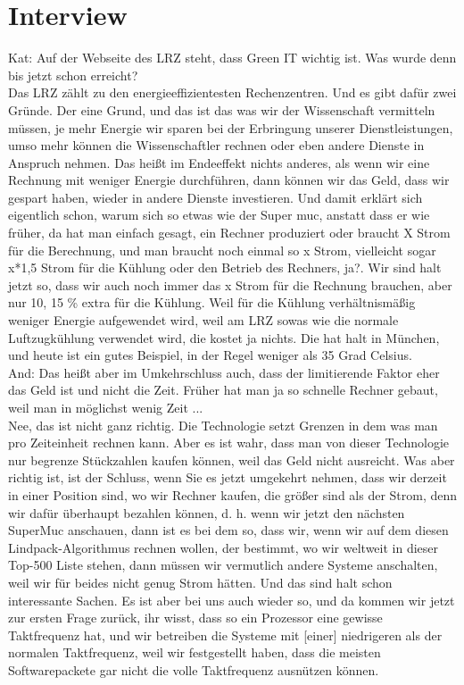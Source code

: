 \section{Interview}
Kat: Auf der Webseite des LRZ steht, dass Green IT wichtig ist. Was wurde denn bis jetzt schon erreicht? \\
Das LRZ zählt zu den energieeffizientesten Rechenzentren. Und es gibt dafür zwei Gründe. Der eine Grund, und das ist das was wir der Wissenschaft vermitteln müssen, je mehr Energie wir sparen bei der Erbringung unserer Dienstleistungen, umso mehr können die Wissenschaftler rechnen oder eben andere Dienste in Anspruch nehmen. Das heißt im Endeeffekt nichts anderes, als wenn wir eine Rechnung mit weniger Energie durchführen, dann können wir das Geld, dass wir gespart haben, wieder in andere Dienste investieren. Und damit erklärt sich eigentlich schon, warum sich so etwas wie der Super muc, anstatt dass er wie früher, da hat man einfach gesagt, ein Rechner produziert oder braucht
X Strom für die Berechnung, und man braucht noch einmal so x Strom, vielleicht sogar x*1,5 Strom für die Kühlung oder den Betrieb des Rechners, ja?. Wir sind halt jetzt so, dass wir auch noch immer das x Strom für die Rechnung brauchen, aber nur 10, 15 \% extra für die Kühlung. Weil für die Kühlung verhältnismäßig weniger Energie aufgewendet wird, weil am LRZ sowas wie die normale Luftzugkühlung verwendet wird, die kostet ja nichts. Die hat halt in München, und heute ist ein gutes Beispiel, in der Regel weniger als 35 Grad Celsius. \\
And: Das heißt aber im Umkehrschluss auch, dass der limitierende Faktor eher das Geld ist und nicht die Zeit. Früher hat man ja so schnelle Rechner gebaut, weil man in möglichst wenig Zeit ... \\
Nee, das ist nicht ganz richtig. Die Technologie setzt Grenzen in dem was man pro Zeiteinheit rechnen kann. Aber es ist wahr, dass man von dieser Technologie nur begrenze Stückzahlen kaufen können, weil das Geld nicht ausreicht. Was aber richtig ist, ist der Schluss, wenn Sie es jetzt umgekehrt nehmen, dass wir derzeit in einer Position sind, wo wir Rechner kaufen, die größer sind als der Strom, denn wir dafür überhaupt bezahlen können, d. h. wenn wir jetzt den nächsten SuperMuc anschauen, dann ist es bei dem so, dass wir, wenn wir auf dem diesen Lindpack-Algorithmus rechnen wollen, der bestimmt, wo wir weltweit in dieser Top-500 Liste stehen, dann müssen wir vermutlich andere Systeme anschalten, weil wir für beides nicht genug Strom hätten. Und das sind halt schon interessante Sachen. Es ist aber bei uns auch wieder so, und da kommen wir jetzt zur ersten Frage zurück, ihr wisst, dass so ein Prozessor eine gewisse Taktfrequenz hat, und wir betreiben die Systeme mit [einer] niedrigeren als der normalen Taktfrequenz, weil wir festgestellt haben, dass die meisten Softwarepackete gar nicht die volle Taktfrequenz ausnützen können. \\
